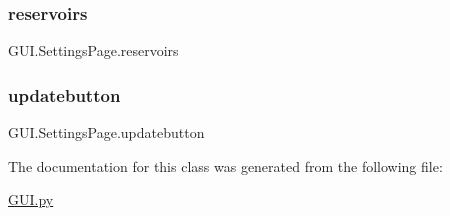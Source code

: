 \subsubsection{\texorpdfstring{reservoirs}{reservoirs}}
{\footnotesize\ttfamily G\+U\+I.\+Settings\+Page.\+reservoirs}

\mbox{\label{class_g_u_i_1_1_settings_page_ac8b17c2d99c2f905ee0f186edcf805eb}} 
\subsubsection{\texorpdfstring{updatebutton}{updatebutton}}
{\footnotesize\ttfamily G\+U\+I.\+Settings\+Page.\+updatebutton}



The documentation for this class was generated from the following file\+:\begin{DoxyCompactItemize}
\item 
\mbox{\hyperlink{_g_u_i_8py}{G\+U\+I.\+py}}\end{DoxyCompactItemize}
